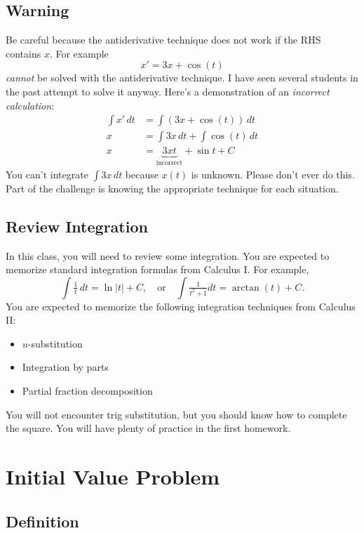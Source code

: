 \documentclass[letterpaper]{article}
\begin{document}
\subsection{Warning}

Be careful because the antiderivative technique does not work if the RHS contains $x$. For example 
\[
    x' = 3x+\cos(t)
\]
\textit{cannot} be solved with the antiderivative technique. I have seen several  students in the past attempt to solve it anyway. Here's a demonstration of an \emph{incorrect calculation}:
\begin{align*}
    \int x'\,dt &= \int(3x+\cos(t))\,dt\\
    x &= \int 3x\,dt +\int\cos(t)\,dt\\
    x &= \underbrace{ 3xt}_{\text{incorrect}} +\sin t+C
\end{align*}
You can't integrate $\int 3x \,dt$ because $x(t)$ is unknown. Please don't ever do this.
Part of the challenge is knowing the appropriate technique for each situation.

\subsection{Review Integration}
In this class, you will need to review some integration. You are expected to memorize standard integration formulas from Calculus I. For example, 
\[
\int \tfrac{1}{t} \,dt = \ln|t|+C, \quad \text{or} \quad \int \tfrac{1}{t^2+1}dt = \arctan(t)+C.    
\]
You are expected to memorize the following integration techniques from Calculus II:
\begin{itemize}
    \item $u$-substitution
    \item Integration by parts 
    \item Partial fraction decomposition 
\end{itemize}
You will not encounter trig substitution, but you should know how to complete the square. You will have plenty of practice in the first homework.

\section{Initial Value Problem}

\subsection{Definition}
\end{document}
